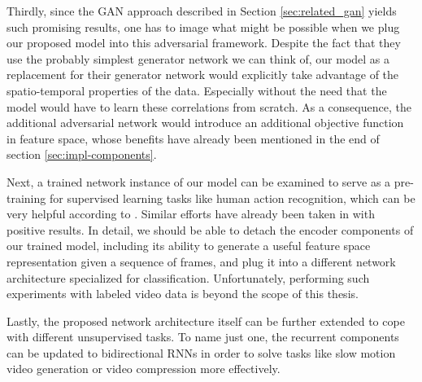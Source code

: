 Thirdly, since the GAN approach described in Section \ref{sec:related_gan} yields such promising results, one has to image what might be possible when we plug our proposed model into this adversarial framework. Despite the fact that they use the probably simplest generator network we can think of, our model as a replacement for their generator network would explicitly take advantage of the spatio-temporal properties of the data. Especially without the need that the model would have to learn these correlations from scratch. As a consequence, the additional adversarial network would introduce an additional objective function in feature space, whose benefits have already been mentioned in the end of section \ref{sec:impl-components}.

Next, a trained network instance of our model can be examined to serve as a pre-training for supervised learning tasks like human action recognition, which can be very helpful according to \parencite[p. 20]{deep_arch_ai}. Similar efforts have already been taken in \parencite{unsup_learn_lstm} with positive results. In detail, we should be able to detach the encoder components of our trained model, including its ability to generate a useful feature space representation given a sequence of frames, and plug it into a different network architecture specialized for classification. Unfortunately, performing such experiments with labeled video data is beyond the scope of this thesis.

Lastly, the proposed network architecture itself can be further extended to cope with different unsupervised tasks. To name just one, the recurrent components can be updated to bidirectional RNNs in order to solve tasks like slow motion video generation or video compression more effectively.